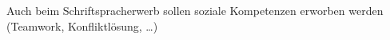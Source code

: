 Auch beim Schriftspracherwerb sollen soziale Kompetenzen erworben werden (Teamwork, Konfliktlösung, …)